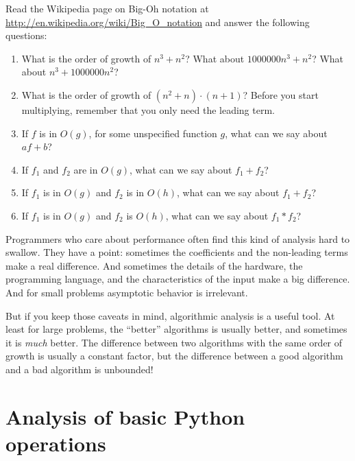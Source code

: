 \documentclass[10pt]{book}
\begin{document}
\begin{exercise}

Read the Wikipedia page on Big-Oh notation at
\url{http://en.wikipedia.org/wiki/Big_O_notation} and
answer the following questions:

\begin{enumerate}

\item What is the order of growth of $n^3 + n^2$?
What about $1000000 n^3 + n^2$?
What about $n^3 + 1000000 n^2$?

\item What is the order of growth of $(n^2 + n) \cdot (n + 1)$?  Before
  you start multiplying, remember that you only need the leading term.

\item If $f$ is in $O(g)$, for some unspecified function $g$, what can
  we say about $a f + b$?

\item If $f_1$ and $f_2$ are in $O(g)$, what can we say about $f_1 + f_2$?

\item If  $f_1$ is in $O(g)$
and $f_2$ is in $O(h)$,
what can we say about  $f_1 + f_2$?

\item If  $f_1$ is in $O(g)$ and $f_2$ is $O(h)$,
what can we say about  $f_1 * f_2$?

\end{enumerate}

\end{exercise}


Programmers who care about performance often find this kind of
analysis hard to swallow.  They have a point: sometimes the
coefficients and the non-leading terms make a real difference.  And
sometimes the details of the hardware, the programming language, and
the characteristics of the input make a big difference.  And for small
problems asymptotic behavior is irrelevant.

But if you keep those caveats in mind, algorithmic analysis is a
useful tool.  At least for large problems, the ``better'' algorithms
is usually better, and sometimes it is {\em much} better.  The
difference between two algorithms with the same order of growth is
usually a constant factor, but the difference between a good algorithm
and a bad algorithm is unbounded!


\section{Analysis of basic Python operations}
\end{document}
